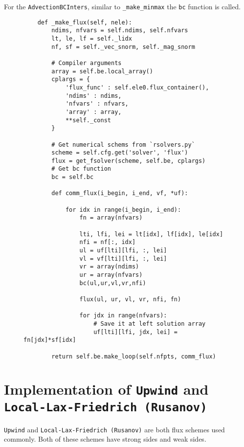 \documentclass[a4paper, 12pt]{article}
\begin{document}
For the \verb|AdvectionBCInters|, similar to \verb|_make_minmax| the \verb|bc| function is called. 

\begin{figure}[H]
\begin{verbatim}
    def _make_flux(self, nele):
        ndims, nfvars = self.ndims, self.nfvars
        lt, le, lf = self._lidx
        nf, sf = self._vec_snorm, self._mag_snorm
        
        # Compiler arguments
        array = self.be.local_array()
        cplargs = {
            'flux_func' : self.ele0.flux_container(),
            'ndims' : ndims,
            'nfvars' : nfvars,
            'array' : array,
            **self._const
        }

        # Get numerical schems from `rsolvers.py`
        scheme = self.cfg.get('solver', 'flux')
        flux = get_fsolver(scheme, self.be, cplargs)
        # Get bc function 
        bc = self.bc

        def comm_flux(i_begin, i_end, vf, *uf):

            for idx in range(i_begin, i_end):
                fn = array(nfvars)

                lti, lfi, lei = lt[idx], lf[idx], le[idx]
                nfi = nf[:, idx]
                ul = uf[lti][lfi, :, lei]
                vl = vf[lti][lfi, :, lei]
                vr = array(ndims)
                ur = array(nfvars)
                bc(ul,ur,vl,vr,nfi)

                flux(ul, ur, vl, vr, nfi, fn)

                for jdx in range(nfvars):
                    # Save it at left solution array
                    uf[lti][lfi, jdx, lei] = fn[jdx]*sf[idx]

        return self.be.make_loop(self.nfpts, comm_flux)
\end{verbatim} 
\label{bcf}
\end{figure}
\par

\section{Implementation of \texttt{Upwind} and \texttt{Local-Lax-Friedrich (Rusanov)}} \label{c6}

\verb|Upwind| and \verb|Local-Lax-Friedrich (Rusanov)| are both flux schemes used commonly. Both of these schemes have strong sides and weak sides.
\end{document}

